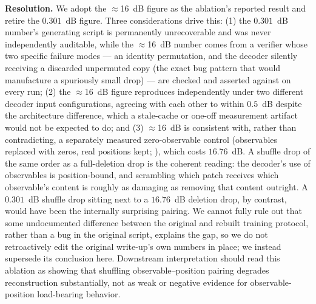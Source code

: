 \documentclass[11pt]{article}
\begin{document}
\textbf{Resolution.} We adopt the $\approx$16~dB figure as the ablation's reported result and retire the $0.301$~dB figure. Three considerations drive this: (1) the $0.301$~dB number's generating script is permanently unrecoverable and was never independently auditable, while the $\approx$16~dB number comes from a verifier whose two specific failure modes --- an identity permutation, and the decoder silently receiving a discarded unpermuted copy (the exact bug pattern that would manufacture a spuriously small drop) --- are checked and asserted against on every run; (2) the $\approx$16~dB figure reproduces independently under two different decoder input configurations, agreeing with each other to within $0.5$~dB despite the architecture difference, which a stale-cache or one-off measurement artifact would not be expected to do; and (3) $\approx$16~dB is consistent with, rather than contradicting, a separately measured zero-observable control (observables replaced with zeros, real positions kept; ), which costs $16.76$~dB. A shuffle drop of the same order as a full-deletion drop is the coherent reading: the decoder's use of observables is position-bound, and scrambling which patch receives which observable's content is roughly as damaging as removing that content outright. A $0.301$~dB shuffle drop sitting next to a $16.76$~dB deletion drop, by contrast, would have been the internally surprising pairing. We cannot fully rule out that some undocumented difference between the original and rebuilt training protocol, rather than a bug in the original script, explains the gap, so we do not retroactively edit the original write-up's own numbers in place; we instead supersede its conclusion here. Downstream interpretation should read this ablation as showing that shuffling observable--position pairing degrades reconstruction substantially, not as weak or negative evidence for observable-position load-bearing behavior.
\end{document}
